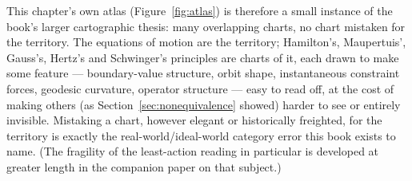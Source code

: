 \documentclass[11pt]{book}
\theoremstyle{definition}
\theoremstyle{plain}
\theoremstyle{remark}
\begin{document}
This chapter's own atlas (Figure~\ref{fig:atlas}) is therefore a small instance of the book's larger cartographic thesis: many overlapping charts, no chart mistaken for the territory. The equations of motion are the territory; Hamilton's, Maupertuis', Gauss's, Hertz's and Schwinger's principles are charts of it, each drawn to make some feature --- boundary-value structure, orbit shape, instantaneous constraint forces, geodesic curvature, operator structure --- easy to read off, at the cost of making others (as Section~\ref{sec:nonequivalence} showed) harder to see or entirely invisible. Mistaking a chart, however elegant or historically freighted, for the territory is exactly the real-world/ideal-world category error this book exists to name. (The fragility of the least-action reading in particular is developed at greater length in the companion paper on that subject.)
\end{document}
